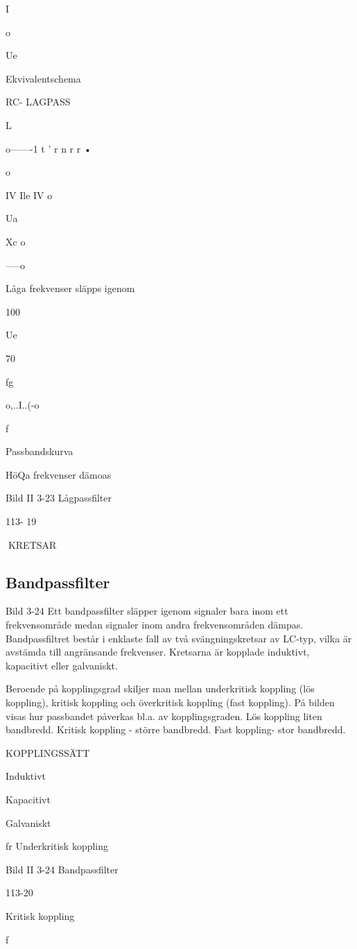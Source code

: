 {I

o

Ue

Ekvivalentschema

RC- LAGPASS

L

o-------1 t ' r n r r •

o

IV Ile IV
o

Ua

Xc
o

-----o

Låga frekvenser släpps igenom

100

Ue

70

fg

o,..I..(-o

f

Passbandskurva

HöQa frekvenser dämoas

Bild II 3-23 Lågpassfilter

113- 19

KRETSAR

\subsection{Bandpassfilter}

Bild 3-24
Ett bandpassfilter släpper igenom signaler
bara inom ett frekvensområde medan signaler inom andra frekvensområden dämpas.
Bandpassfiltret består i enklaste fall av
två svängningskretsar av LC-typ, vilka är
avstämda till angränsande frekvenser. Kretsarna är kopplade induktivt, kapacitivt eller
galvaniskt.

Beroende på kopplingsgrad skiljer man
mellan underkritisk koppling (lös koppling),
kritisk koppling och överkritisk koppling (fast
koppling).
På bilden visas hur passbandet påverkas
bl.a. av kopplingsgraden. Lös koppling liten bandbredd. Kritisk koppling - större
bandbredd. Fast koppling- stor bandbredd.

KOPPLINGSSÄTT

Induktivt

Kapacitivt

Galvaniskt

fr
Underkritisk koppling

Bild II 3-24 Bandpassfilter

113-20

Kritisk koppling

f

}
